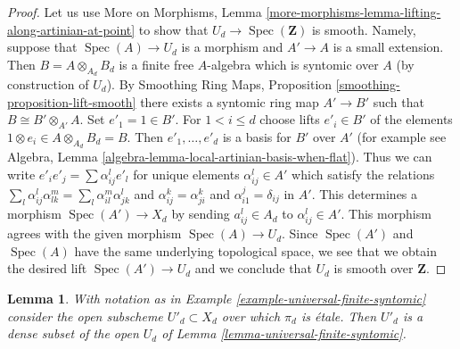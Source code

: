 \documentclass{stacks-project}
\theoremstyle{plain}
\newtheorem{lemma}[subsection]{Lemma}
\theoremstyle{definition}
\theoremstyle{remark}
\numberwithin{equation}{subsection}
\def\Spec{\mathop{\mathrm{Spec}}}
\begin{document}
\begin{proof}
Let us use More on Morphisms, Lemma
\ref{more-morphisms-lemma-lifting-along-artinian-at-point}
to show that $U_d \to \Spec(\mathbf{Z})$ is smooth.
Namely, suppose that $\Spec(A) \to U_d$ is a morphism
and $A' \to A$ is a small extension. Then $B = A \otimes_{A_d} B_d$
is a finite free $A$-algebra which is syntomic over $A$
(by construction of $U_d$). By
Smoothing Ring Maps, Proposition \ref{smoothing-proposition-lift-smooth}
there exists a syntomic ring map $A' \to B'$ such that
$B \cong B' \otimes_{A'} A$. Set $e'_1 = 1 \in B'$. For $1 < i \leq d$
choose lifts $e'_i \in B'$ of the elements
$1 \otimes e_i \in A \otimes_{A_d} B_d = B$. Then $e'_1, \ldots, e'_d$
is a basis for $B'$ over $A'$ (for example see Algebra, Lemma
\ref{algebra-lemma-local-artinian-basis-when-flat}).
Thus we can write $e'_i e'_j = \sum \alpha_{ij}^l e'_l$ for unique
elements $\alpha_{ij}^l \in A'$ which satisfy the relations
$\sum_l \alpha_{ij}^l \alpha_{lk}^m = \sum_l \alpha_{il}^m \alpha _{jk}^l$
and $\alpha_{ij}^k = \alpha_{ji}^k$ and $\alpha_{i1}^j = \delta_{ij}$
in $A'$. This determines a morphism $\Spec(A') \to X_d$ by
sending $a_{ij}^l \in A_d$ to $\alpha_{ij}^l \in A'$. This morphism
agrees with the given morphism $\Spec(A) \to U_d$. Since $\Spec(A')$
and $\Spec(A)$ have the same underlying topological space, we see
that we obtain the desired lift $\Spec(A') \to U_d$ and we
conclude that $U_d$ is smooth over $\mathbf{Z}$.
\end{proof}

\begin{lemma}
\label{lemma-universal-finite-syntomic-etale}
With notation as in Example \ref{example-universal-finite-syntomic}
consider the open subscheme $U'_d \subset X_d$ over which
$\pi_d$ is \'etale. Then $U'_d$ is a dense subset of the
open $U_d$ of Lemma \ref{lemma-universal-finite-syntomic}.
\end{lemma}
\end{document}
